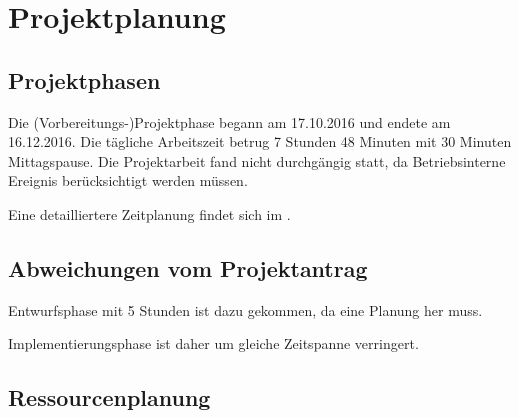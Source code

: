 
\newpage
\section{Projektplanung} 
\label{sec:Projektplanung}


\subsection{Projektphasen}
\label{sec:Projektphasen}

Die (Vorbereitungs-)Projektphase begann am 17.10.2016 und endete am 16.12.2016.
Die tägliche Arbeitszeit betrug 7 Stunden 48 Minuten mit 30 Minuten Mittagspause.
Die Projektarbeit fand nicht durchgängig statt, da Betriebsinterne Ereignis berücksichtigt werden müssen.


Eine detailliertere Zeitplanung findet sich im .

\subsection{Abweichungen vom Projektantrag}
\label{sec:AbweichungenProjektantrag}

Entwurfsphase mit 5 Stunden ist dazu gekommen, da eine Planung her muss.

Implementierungsphase ist daher um gleiche Zeitspanne verringert.  %

\subsection{Ressourcenplanung}
\label{sec:Ressourcenplanung}

